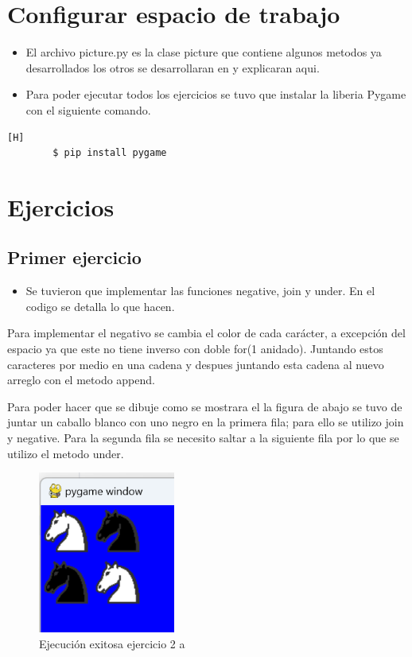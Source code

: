 \documentclass{article}
\begin{document}
	\section{Configurar espacio de trabajo}
	\begin{itemize}	
		\item El archivo picture.py es la clase picture que contiene algunos metodos ya desarrollados
		los otros se desarrollaran en y explicaran aqui.
		\item Para poder ejecutar todos los ejercicios se tuvo que instalar la liberia Pygame
		con el siguiente comando.
	\end{itemize}	
	\begin{lstlisting}[language=bash,caption={Instalar libreria Pygame}][H]
		$ pip install pygame
	\end{lstlisting}
	\section{Ejercicios}
	\subsection{Primer ejercicio}
	\begin{itemize}	
		\item Se tuvieron que implementar las funciones negative, join y under. 
		En el codigo se detalla lo que hacen.
	\end{itemize}
	
	Para implementar el negativo se cambia el color de cada carácter, a excepción del espacio
	ya que este no tiene inverso con doble for(1 anidado). Juntando estos caracteres
	por medio en una cadena y despues juntando esta cadena al nuevo arreglo 
	con el metodo append.
	
	Para poder hacer que se dibuje como se mostrara el la figura de abajo se tuvo de juntar un caballo
	blanco con uno negro en la primera fila; para ello se utilizo join y negative. Para la segunda
	fila se necesito saltar a la siguiente fila por lo que se utilizo el metodo under.
	\begin{figure}[H]
		\centering
		\includegraphics[width=0.4\textwidth,keepaspectratio]{img/e2a.png}
		\caption{Ejecución exitosa ejercicio 2 a}
	\end{figure}
\end{document}
